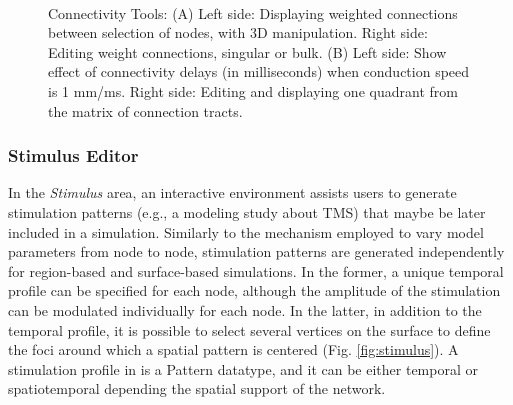  \begin{figure}[!htbp]
		\centering
		\\
		\caption{Connectivity Tools: 
		(A) Left side: Displaying weighted connections between selection of nodes, with 3D manipulation.
		Right side: Editing weight connections, singular or bulk.
		(B) Left side: Show effect of connectivity delays (in milliseconds) when conduction speed is 1 mm/ms.
		Right side: Editing and displaying one quadrant from the matrix of connection tracts.}
				\label{fig:connectivity}
\end{figure}

\subsubsection{Stimulus Editor}

	In the \emph{Stimulus} area, an interactive environment assists users to
	generate stimulation patterns (e.g., a modeling study about TMS) that maybe be
	later included in a simulation. Similarly to the mechanism employed to vary
	model parameters from node to node, stimulation patterns are generated
	independently for region-based and surface-based simulations. In the former, a
	unique temporal profile can be specified for each node, although the amplitude
	of the stimulation can be modulated individually for each node. In the latter,
	in addition to the temporal profile, it is possible to select several vertices
	on the surface to define the foci around which a spatial pattern is centered
	(Fig. \ref{fig:stimulus}). A stimulation profile in \TVB is a Pattern
	datatype, and it can be either temporal or spatiotemporal depending the
	spatial support of the network.


